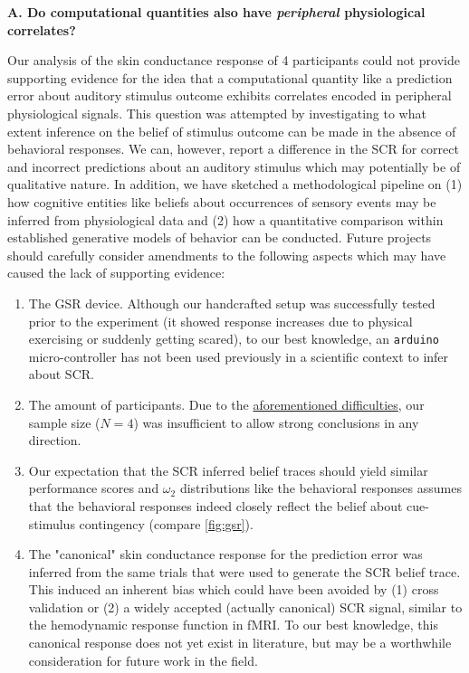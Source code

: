 \documentclass{article}
\begin{document}
\begin{multicols}{2}
\textbf{A. Do computational quantities also have \textit{peripheral} physiological correlates?}

Our analysis of the skin conductance response of 4 participants could not provide supporting evidence for the idea that a computational quantity like a prediction error about auditory stimulus outcome exhibits correlates encoded in peripheral physiological signals. This question was attempted by investigating to what extent inference on the belief of stimulus outcome can be made in the absence of behavioral responses. We can, however, report a difference in the SCR for correct and incorrect predictions about an auditory stimulus which may potentially be of qualitative nature. In addition, we have sketched a methodological pipeline on (1) how cognitive entities like beliefs about occurrences of sensory events may be inferred from physiological data and (2) how a quantitative comparison within established generative models of behavior can be conducted. Future projects should carefully consider amendments to the following aspects which may have caused the lack of supporting evidence:
\begin{enumerate}
\item The GSR device. Although our handcrafted setup was successfully tested prior to the experiment (it showed response increases due to physical exercising or suddenly getting scared), to our best knowledge, an \texttt{arduino} micro-controller has not been used previously in a scientific context to infer about SCR.
\item The amount of participants. Due to the \hyperref[sec:purge]{aforementioned difficulties}, our sample size ($N=4$) was insufficient to allow strong conclusions in any direction.
\item Our expectation that the SCR inferred belief traces should yield similar performance scores and $\omega_2$ distributions like the behavioral responses assumes that the behavioral responses indeed closely reflect the belief about cue-stimulus contingency (compare \autoref{fig:gsr}).
\item The "canonical" skin conductance response for the prediction error was inferred from the same trials that were used to generate the SCR belief trace. This induced an inherent bias which could have been avoided by (1) cross validation or (2) a widely accepted (actually canonical) SCR signal, similar to the hemodynamic response function in fMRI. To our best knowledge, this canonical response does not yet exist in literature, but may be a worthwhile consideration for future work in the field.
\end{enumerate}









\end{multicols}
\end{document}
